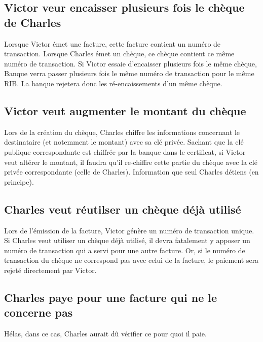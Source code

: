\documentclass[oneside,10pt]{article}
\begin{document}
\subsection{Victor veur encaisser plusieurs fois le ch\`eque de Charles}
Lorsque Victor \'emet une facture, cette facture contient un num\'ero de transaction.
Lorsque Charles \'emet un ch\`eque, ce ch\`eque contient ce m\^eme num\'ero de transaction.
Si Victor essaie d'encaisser plusieurs fois le m\^eme ch\`eque, Banque verra passer plusieurs fois le m\^eme num\'ero de transaction pour le m\^eme RIB.
La banque rejetera donc les r\'e-encaissements d'un m\^eme ch\`eque.

\subsection{Victor veut augmenter le montant du ch\`eque}
Lors de la cr\'eation du ch\`eque, Charles chiffre les informations concernant le destinataire (et notemment le montant) avec sa cl\'e priv\'ee.
Sachant que la cl\'e publique correspondante est chiffr\'ee par la banque dans le certificat, si Victor veut alt\'erer le montant, il faudra qu'il re-chiffre cette partie du ch\`eque avec la cl\'e priv\'ee correspondante (celle de Charles).
Information que seul Charles d\'etiens (en principe).

\subsection{Charles veut r\'eutilser un ch\`eque d\'ej\`a utilis\'e}
Lors de l'\'emission de la facture, Victor g\'en\`ere un num\'ero de transaction unique.
Si Charles veut utiliser un ch\`eque d\'ej\`a utilis\'e, il devra fatalement y apposer un num\'ero de transaction qui a servi pour une autre facture.
Or, si le num\'ero de transaction du ch\`eque ne correspond pas avec celui de la facture, le paiement sera rejet\'e directement par Victor.

\subsection{Charles paye pour une facture qui ne le concerne pas}
H\'elas, dans ce cas, Charles aurait d\^u v\'erifier ce pour quoi il paie.
\end{document}
